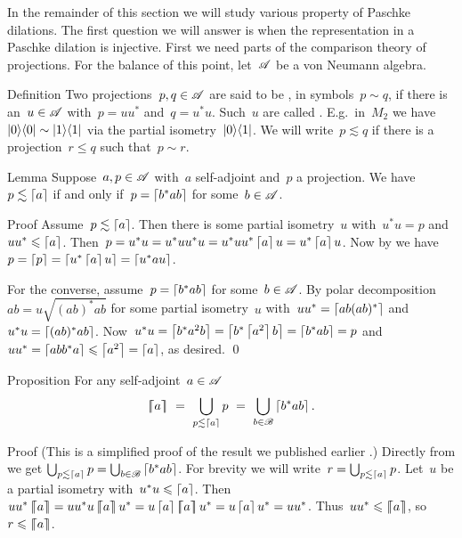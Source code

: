 \documentclass[b]{subfiles}
\begin{document}
\begin{parsec}%
\begin{point}%
In the remainder of this section we will study various property
    of Paschke dilations.
The first question we will answer is
    when the representation in a Paschke dilation is injective.
First we need parts of the comparison theory of projections.
For the balance of this point, let~$\mathscr{A}$ be a von Neumann algebra.
\end{point}
\begin{point}{Definition}%
Two projections~$p,q \in \mathscr{A}$ are said to be
    ,
    in symbols~$p \sim q$,
    if there is an~$u \in \mathscr{A}$
    with~$p = uu^*$ and~$q = u^*u$.
Such~$u$ are called .
E.g.~in~$M_2$ we have~$\left|0\right>\!\left<0\right| \sim \left|1\right>\!\left<1\right|$
    via the partial isometry~$\left|0\right>\!\left<1\right|$.
We will write~$p \lesssim q$
    if there is a projection~$r \leq q$
    such that~$p \sim r$.
\end{point}
\begin{point}{Lemma}%
Suppose~$a,p \in \mathscr{A}$ with~$a$ self-adjoint and~$p$ a projection.
We have~$p \lesssim \left\lceil a\right\rceil$
    if and only if~$p = \left\lceil b^* a b\right\rceil$ for some~$b \in \mathscr{A}$.
\begin{point}{Proof}%
Assume~$p \lesssim \left\lceil a\right\rceil$.
Then there is some partial isometry~$u$
    with~$u^*u = p$ and~$uu^* \leqslant \left\lceil a\right\rceil$.
Then~$p = u^*u= u^*uu^*u = u^*uu^*\left\lceil a\right\rceil u = u^*\left\lceil a\right\rceil u$.
Now by  we have~$p = \left\lceil p\right\rceil = \left\lceil u^*\left\lceil a\right\rceil u\right\rceil=\left\lceil u^*au\right\rceil$.

For the converse, assume~$p = \left\lceil b^*ab\right\rceil$ for some~$b \in \mathscr{A}$.
By polar decomposition ~$ab = u \sqrt{(ab)^*ab}$
    for some partial isometry~$u$
    with~$uu^* = \left\lceil ab(ab)^*\right\rceil$ and~$u^*u = \left\lceil(ab)^*ab\right\rceil$.
Now~$u^*u = \left\lceil b^*a^2b\right\rceil = \left\lceil b^*\left\lceil a^2\right\rceil b\right\rceil = \left\lceil b^*ab\right\rceil=p$
and~$uu^* = \left\lceil abb^*a\right\rceil \leqslant \left\lceil a^2\right\rceil = \left\lceil a\right\rceil$, as desired. \qed
\end{point}
\end{point}
\begin{point}{Proposition}%
For any self-adjoint~$a \in \mathscr{A}$
\begin{equation*}
    \left\lceil\!\!\left\lceil a\right\rceil\!\!\right\rceil \ =\  \bigcup_{p \lesssim \left\lceil a\right\rceil} p
\ = \ \bigcup_{b \in \mathscr{B}} \left\lceil b^*ab\right\rceil.
\end{equation*}
\begin{point}{Proof}%
(This is a simplified proof of the result we published
earlier \cite[Thm.~28 sub 1]{wwpaschke}.)
Directly from 
    we get $\bigcup_{p \lesssim \left\lceil a\right\rceil} p = \bigcup_{b \in \mathscr{B}} \left\lceil b^*ab\right\rceil$.
For brevity we will write~$r = \bigcup_{p \lesssim \left\lceil a\right\rceil} p$.
Let~$u$ be a partial isometry with~$u^*u \leqslant \left\lceil a\right\rceil$.
Then~$uu^*\cceil{a} = uu^*u \cceil{a} u^*= u \ceil{a} \cceil{a} u^*
        = u \ceil{a} u^*  = uu^*$.
Thus~$uu^* \leqslant \left\lceil\!\!\left\lceil a\right\rceil\!\!\right\rceil$, so~$r \leqslant \left\lceil\!\!\left\lceil a\right\rceil\!\!\right\rceil$.


\end{point}
\end{point}
\end{parsec}
\end{document}

